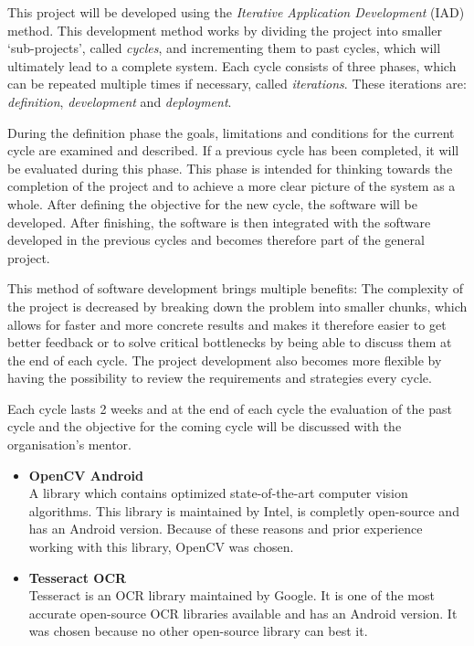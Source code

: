 
This project will be developed using the \emph{Iterative Application Development} (IAD) method. This development method works by dividing the project into smaller `sub-projects', called \emph{cycles}, and incrementing them to past cycles, which will ultimately lead to a complete system. Each cycle consists of three phases, which can be repeated multiple times if necessary, called \emph{iterations}. These iterations are: \emph{definition}, \emph{development} and \emph{deployment}.

During the definition phase the goals, limitations and conditions for the current cycle are examined and described. If a previous cycle has been completed, it will be evaluated during this phase. This phase is intended for thinking towards the completion of the project and to achieve a more clear picture of the system as a whole.
After defining the objective for the new cycle, the software will be developed. After finishing, the software is then integrated with the software developed in the previous cycles and becomes therefore part of the general project.

This method of software development brings multiple benefits: The complexity of the project is decreased by breaking down the problem into smaller chunks, which allows for faster and more concrete results and makes it therefore easier to get better feedback or to solve critical bottlenecks by being able to discuss them at the end of each cycle. The project development also becomes more flexible by having the possibility to review the requirements and strategies every cycle.

Each cycle lasts 2 weeks and at the end of each cycle the evaluation of the past cycle and the objective for the coming cycle will be discussed with the organisation's mentor.


\begin{itemize}
    \item{\textbf{OpenCV Android} \\
        A library which contains optimized state-of-the-art computer vision algorithms. This library is maintained by Intel, is completly open-source and has an Android version. Because of these reasons and prior experience working with this library, OpenCV was chosen.
    }

    \item{\textbf{Tesseract OCR} \\
        Tesseract is an OCR library maintained by Google. It is one of the most accurate open-source OCR libraries available and has an Android version. It was chosen because no other open-source library can best it.
    }
\end{itemize}


